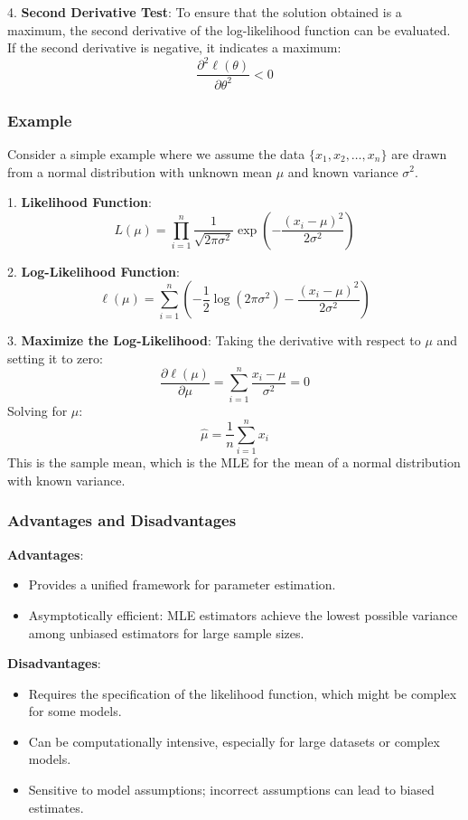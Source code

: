 4. \textbf{Second Derivative Test}:
   To ensure that the solution obtained is a maximum, the second derivative of the log-likelihood function can be evaluated. If the second derivative is negative, it indicates a maximum:
   \[
   \frac{\partial^2 \ell(\theta)}{\partial \theta^2} < 0
   \]

\subsubsection*{Example}

Consider a simple example where we assume the data \(\{x_1, x_2, \ldots, x_n\}\) are drawn from a normal distribution with unknown mean \(\mu\) and known variance \(\sigma^2\).

1. \textbf{Likelihood Function}:
   \[
   L(\mu) = \prod_{i=1}^n \frac{1}{\sqrt{2\pi\sigma^2}} \exp\left(-\frac{(x_i - \mu)^2}{2\sigma^2}\right)
   \]

2. \textbf{Log-Likelihood Function}:
   \[
   \ell(\mu) = \sum_{i=1}^n \left( -\frac{1}{2} \log(2\pi\sigma^2) - \frac{(x_i - \mu)^2}{2\sigma^2} \right)
   \]

3. \textbf{Maximize the Log-Likelihood}:
   Taking the derivative with respect to \(\mu\) and setting it to zero:
   \[
   \frac{\partial \ell(\mu)}{\partial \mu} = \sum_{i=1}^n \frac{x_i - \mu}{\sigma^2} = 0
   \]
   Solving for \(\mu\):
   \[
   \hat{\mu} = \frac{1}{n} \sum_{i=1}^n x_i
   \]
   This is the sample mean, which is the MLE for the mean of a normal distribution with known variance.

\subsubsection*{Advantages and Disadvantages}

\textbf{Advantages}:
\begin{itemize}
    \item Provides a unified framework for parameter estimation.
    \item Asymptotically efficient: MLE estimators achieve the lowest possible variance among unbiased estimators for large sample sizes.
\end{itemize}

\textbf{Disadvantages}:
\begin{itemize}
    \item Requires the specification of the likelihood function, which might be complex for some models.
    \item Can be computationally intensive, especially for large datasets or complex models.
    \item Sensitive to model assumptions; incorrect assumptions can lead to biased estimates.
\end{itemize}

